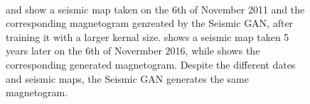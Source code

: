\documentclass[11pt,a4paper,onecolumn]{report}
\begin{document}
\begin{figure}[t]%
  \centering
   \\
  \caption[]{ and 
  show a seismic map taken on the 6th of November 2011 and the corresponding
  magnetogram genreated by the Seismic GAN, after training it with a larger
  kernal size.  shows a seismic map taken 5 years
  later on the 6th of Novermber 2016, while  shows
  the corresponding generated magnetogram. Despite the different dates and
  seismic maps, the Seismic GAN generates the same magnetogram.}
  \label{fig:mode_collapse}
\end{figure}
\end{document}
